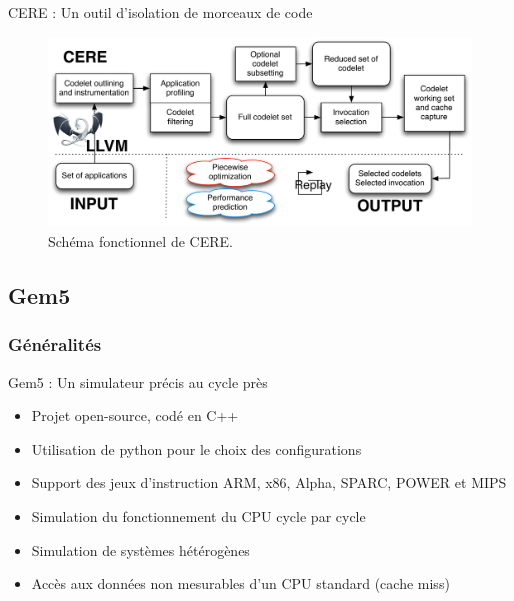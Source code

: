 \documentclass{beamer}
\begin{document}
\begin{frame}{CERE : Un outil d'isolation de morceaux de code}
\begin{figure}[ht]
\begin{center}
\includegraphics[width=0.85\linewidth]{cere_fonction.pdf}
\caption{\label{CERE_schema}Schéma fonctionnel de CERE.}
\end{center}
\end{figure}
\end{frame}

\subsection{Gem5}
\subsubsection{Généralités}
\begin{frame}{Gem5 : Un simulateur précis au cycle près}

\begin{itemize}
\item Projet open-source, codé en C++
\medskip
\item Utilisation de python pour le choix des configurations
\medskip
\item Support des jeux d'instruction ARM, x86, Alpha, SPARC, POWER et MIPS
\medskip
\item Simulation du fonctionnement du CPU cycle par cycle
\medskip
\item Simulation de systèmes hétérogènes
\medskip
\item Accès aux données non mesurables d'un CPU standard (cache miss) 
\end{itemize}

\end{frame}
\end{document}
